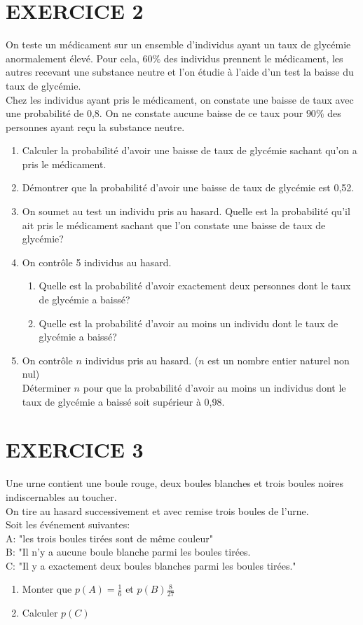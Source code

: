 \documentclass[13pts]{report}
\begin{document}
	\section*{EXERCICE 2}
	On teste un médicament sur un ensemble d'individus ayant un taux de glycémie anormalement élevé. Pour cela, $60 \%$ des individus prennent le médicament, les autres recevant une substance neutre et l'on étudie à l'aide d'un test la baisse du taux de glycémie.\\
	Chez les individus ayant pris le médicament, on constate une baisse de taux avec une probabilité de 0,8. On ne constate aucune baisse de ce taux pour $90\%$  des personnes ayant reçu la substance neutre.
	\begin{enumerate}
		\item Calculer la probabilité d'avoir une baisse de taux de glycémie sachant qu'on a pris le médicament.
		\item Démontrer que la probabilité d'avoir une baisse de taux de glycémie est 0,52.
		\item On soumet au test un individu pris au hasard. Quelle est la probabilité qu'il ait pris le médicament sachant que l'on constate une baisse de taux de glycémie?
		\item On contrôle 5 individus au hasard.
		\begin{enumerate}
			\item Quelle est la probabilité d'avoir exactement deux personnes dont le taux de glycémie a baissé?
			\item Quelle est la probabilité d'avoir au moins un individu dont le taux de glycémie a baissé?
		\end{enumerate}
		\item On contrôle $n$ individus pris au hasard. ($n$ est un nombre entier naturel non nul)\\
		Déterminer $n$ pour que la probabilité d'avoir au moins un individus dont le taux de glycémie a baissé soit supérieur à 0,98.
	\end{enumerate}
	
	\section*{EXERCICE 3}
	Une urne contient une boule rouge, deux boules blanches et trois boules noires indiscernables au toucher.\\
	On tire au hasard successivement et avec remise trois boules de l'urne.\\
	Soit les événement suivantes:\\
	A: "les trois boules tirées sont de même couleur"\\
	B: "Il n'y a aucune boule blanche parmi les boules tirées.\\
	C: "Il y a exactement deux boules blanches parmi les boules tirées."
	\begin{enumerate}
		\item Monter que $p(A)=\frac{1}{6}$ et $p(B)$$\frac{8}{27}$
		\item Calculer $p(C)$
	\end{enumerate}
	
\end{document}
